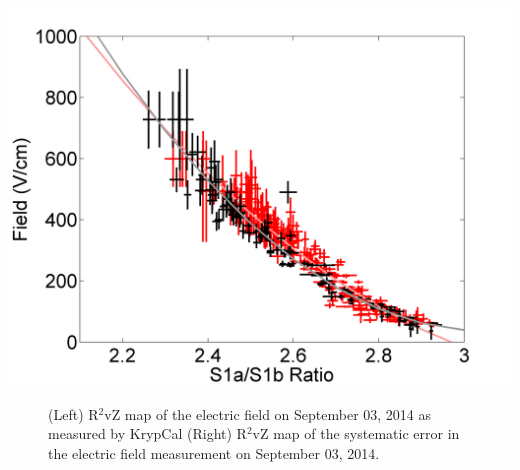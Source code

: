 \documentclass[a4paper,12pt]{article}
\begin{document}
{\begin{center}
\includegraphics[scale=0.6]{Run04Corrections/S1aS1bToField_Overlay.png}
 \label{FieldToS1aS1b}
\end{center}

\begin{figure} [h!]
\centering
{}
\qquad
{}
\caption{ (Left) R$^2$vZ map of the electric field on September 03, 2014 as measured by KrypCal (Right) R$^2$vZ map of the systematic error in the electric field measurement on September 03, 2014.}
\label{KrypFieldMap}
\end{figure}

}
\end{document}
